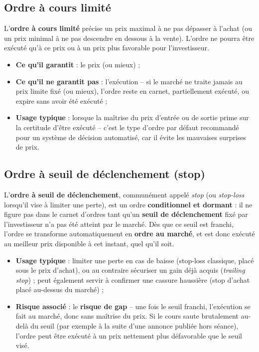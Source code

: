 \documentclass{rapportENSIAS} %
\begin{document}
\subsection{Ordre à cours limité}

\noindent
L'\textbf{ordre à cours limité} précise un prix maximal à ne pas dépasser à l'achat (ou un prix minimal à ne pas descendre en dessous à la vente). L'ordre ne pourra être exécuté qu'à ce prix ou à un prix plus favorable pour l'investisseur.

\begin{itemize}
    \item \textbf{Ce qu'il garantit} : le prix (ou mieux) ;
    \item \textbf{Ce qu'il ne garantit pas} : l'exécution -- si le marché ne traite jamais au prix limite fixé (ou mieux), l'ordre reste en carnet, partiellement exécuté, ou expire sans avoir été exécuté ;
    \item \textbf{Usage typique} : lorsque la maîtrise du prix d'entrée ou de sortie prime sur la certitude d'être exécuté -- c'est le type d'ordre par défaut recommandé pour un système de décision automatisé, car il évite les mauvaises surprises de prix.
\end{itemize}

\subsection{Ordre à seuil de déclenchement (stop)}

\noindent
L'\textbf{ordre à seuil de déclenchement}, communément appelé \textit{stop} (ou \textit{stop-loss} lorsqu'il vise à limiter une perte), est un ordre \textbf{conditionnel et dormant} : il ne figure pas dans le carnet d'ordres tant qu'un \textbf{seuil de déclenchement} fixé par l'investisseur n'a pas été atteint par le marché. Dès que ce seuil est franchi, l'ordre se transforme automatiquement en \textbf{ordre au marché}, et est donc exécuté au meilleur prix disponible à cet instant, quel qu'il soit.

\begin{itemize}
    \item \textbf{Usage typique} : limiter une perte en cas de baisse (stop-loss classique, placé sous le prix d'achat), ou au contraire sécuriser un gain déjà acquis (\textit{trailing stop}) ; peut également servir à confirmer une cassure haussière (stop d'achat placé au-dessus du marché) ;
    \item \textbf{Risque associé} : le \textbf{risque de gap} -- une fois le seuil franchi, l'exécution se fait au marché, donc sans maîtrise du prix. Si le cours \og{}saute\fg{} brutalement au-delà du seuil (par exemple à la suite d'une annonce publiée hors séance), l'ordre peut être exécuté à un prix nettement plus défavorable que le seuil visé.
\end{itemize}
\end{document}
